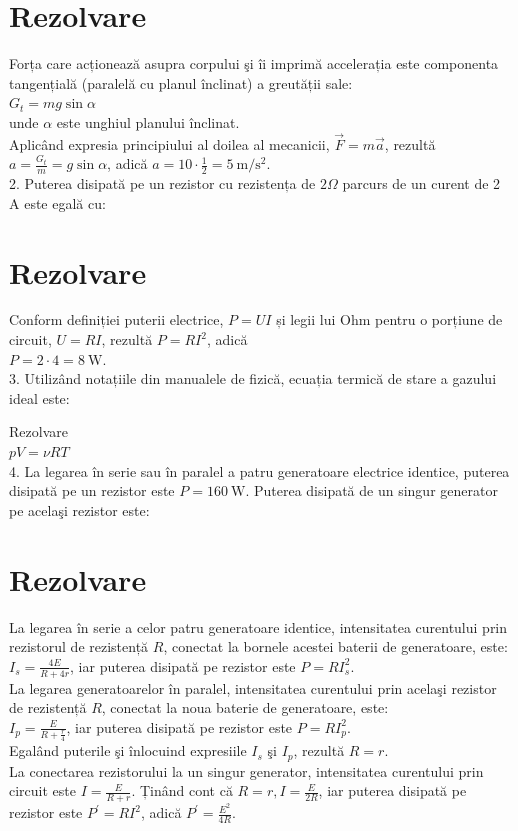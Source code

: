 \section*{Rezolvare}
Forța care acționează asupra corpului şi îi imprimă accelerația este componenta tangențială (paralelă cu planul înclinat) a greutății sale:\\
$G_{t}=m g \sin \alpha$\\
unde $\alpha$ este unghiul planului înclinat.\\
Aplicând expresia principiului al doilea al mecanicii, $\vec{F}=m \vec{a}$, rezultă $a=\frac{G_{t}}{m}=g \sin \alpha$, adică $a=10 \cdot \frac{1}{2}=5 \mathrm{~m} / \mathrm{s}^{2}$.\\
2. Puterea disipată pe un rezistor cu rezistența de $2 \Omega$ parcurs de un curent de 2 A este egală cu:

\section*{Rezolvare}
Conform definiției puterii electrice, $P=U I$ și legii lui Ohm pentru o porțiune de circuit, $U=R I$, rezultă $P=R I^{2}$, adică\\
$P=2 \cdot 4=8 \mathrm{~W}$.\\
3. Utilizând notațiile din manualele de fizică, ecuația termică de stare a gazului ideal este:

Rezolvare\\
$p V=\nu R T$\\
4. La legarea în serie sau în paralel a patru generatoare electrice identice, puterea disipată pe un rezistor este $P=160 \mathrm{~W}$. Puterea disipată de un singur generator pe acelaşi rezistor este:

\section*{Rezolvare}
La legarea în serie a celor patru generatoare identice, intensitatea curentului prin rezistorul de rezistență $R$, conectat la bornele acestei baterii de generatoare, este:\\
$I_{s}=\frac{4 E}{R+4 r}$, iar puterea disipată pe rezistor este $P=R I_{s}^{2}$.\\
La legarea generatoarelor în paralel, intensitatea curentului prin acelaşi rezistor de rezistență $R$, conectat la noua baterie de generatoare, este:\\
$I_{p}=\frac{E}{R+\frac{r}{4}}$, iar puterea disipată pe rezistor este $P=R I_{p}^{2}$.\\
Egalând puterile şi înlocuind expresiile $I_{s}$ şi $I_{p}$, rezultă $R=r$.\\
La conectarea rezistorului la un singur generator, intensitatea curentului prin circuit este $I=\frac{E}{R+r}$. Ținând cont că $R=r, I=\frac{E}{2 R}$, iar puterea disipată pe rezistor este $P^{\prime}=R I^{2}$, adică $P^{\prime}=\frac{E^{2}}{4 R}$.

